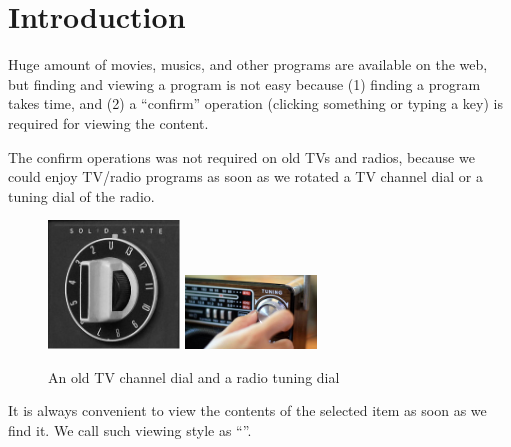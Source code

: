 \documentclass[conference]{IEEEtran}
\begin{document}
\section{Introduction}

% 

Huge amount of movies, musics, and other programs are available on the web, but
finding and viewing a program is not easy because
(1) finding a program takes time, and
(2) a ``confirm'' operation (clicking something or typing a key)
is required for viewing the content.


The confirm operations was not required on old TVs and radios,
because we could enjoy TV/radio programs
as soon as we rotated a TV channel dial or a tuning dial of the radio.

\begin{figure}[H]
\centerline{
   \includegraphics[width=35mm,bb=0 0 279 272]{figures/9bd96506bdaac48b26c5cd192851c11d.png}
   \includegraphics[width=35mm,bb=0 0 128 72]{figures/fedc4f3c899c48b5a3ddd0982801c79d.png}
}
\caption{An old TV channel dial and a radio tuning dial}
\label{TV channel}
\end{figure}



It is always convenient to view the contents of the selected item
as soon as we find it.
We call such viewing style as ``\textbf{}''.
\end{document}
